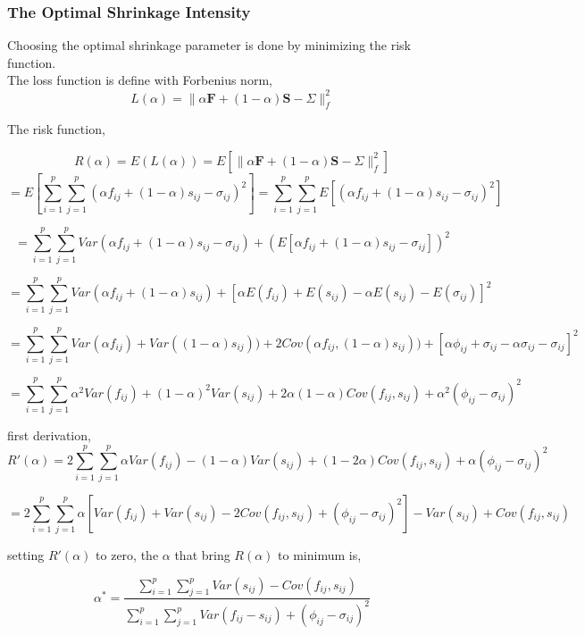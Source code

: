 \documentclass[letterpaper]{article}
\begin{document}
	\subsubsection{The Optimal Shrinkage Intensity}
	Choosing the optimal shrinkage parameter is done by minimizing the risk function.\\

	The loss function is define with Forbenius norm,
	\[L(\alpha) = 
	\lVert 
	\alpha\boldsymbol{F} + \left(1- \alpha  \right) \boldsymbol{S}
	-\Sigma 
	\lVert^{2}_{f} \]
	
	The risk function, 
	
	\[R(\alpha) = E(L(\alpha)) =
	E\left[
	\lVert 
	\alpha\boldsymbol{F} + \left(1- \alpha  \right) \boldsymbol{S}
	-\Sigma 
	\lVert^{2}_{f}   
	\right]
	\]
	\[
	= 
	E\left[   
	\sum_{i=1}^{p}\sum_{j=1}^{p}
	\left(
	\alpha f_{ij}  + (1-\alpha)s_{ij} -\sigma_{ij} 
	\right)^{2}
	\right]
	=
	\sum_{i=1}^{p}\sum_{j=1}^{p}E[	\left(
	\alpha f_{ij}  + (1-\alpha)s_{ij} -\sigma_{ij} 
	\right)^{2}]
	\]
	
	\[
	=
	\sum_{i=1}^{p}\sum_{j=1}^{p}
	Var(\alpha f_{ij} + (1-\alpha)s_{ij} - \sigma_{ij}) + \left(E\left[\alpha f_{ij} + (1-\alpha)s_{ij} - \sigma_{ij} \right] \right)^{2}
	\]
	
	 
	\[=
	\sum_{i=1}^{p}\sum_{j=1}^{p}
	Var(\alpha f_{ij} + (1-\alpha)s_{ij}) 
	+\left[\alpha E(f_{ij}) + E(s_{ij}) -\alpha E(s_{ij}) - E(\sigma_{ij})
	\right]^{2} 
	\]
	
	\[=
	\sum_{i=1}^{p}\sum_{j=1}^{p}
	Var(\alpha f_{ij}) + Var((1-\alpha)s_{ij})) +2Cov(\alpha f_{ij}, (1-\alpha)s_{ij})) 
	+\left[\alpha \phi_{ij} + \sigma_{ij} -\alpha \sigma_{ij} - \sigma_{ij}
	\right]^{2} 
	\]
	
	\[=
	\sum_{i=1}^{p}\sum_{j=1}^{p}
	\alpha^{2}Var(f_{ij})+(1-\alpha)^{2}Var(s_{ij})+2\alpha(1-\alpha)Cov(f_{ij},s_{ij}) +\alpha^{2}(\phi_{ij}-\sigma_{ij})^{2} 
	\]
	
	first derivation,
	\[
	R'(\alpha) = 2
	\sum_{i=1}^{p}\sum_{j=1}^{p}
	\alpha Var(f_{ij}) - (1-\alpha)Var(s_{ij}) +(1-2\alpha)Cov(f_{ij},s_{ij}) +\alpha(\phi_{ij}-\sigma_{ij})^{2}
	\]
	
	\[=
	2\sum_{i=1}^{p}\sum_{j=1}^{p}
	\alpha \left[ Var(f_{ij}) + Var(s_{ij}) -2Cov(f_{ij},s_{ij}) + (\phi_{ij}-\sigma_{ij})^{2}\right]
	- Var(s_{ij}) + Cov(f_{ij},s_{ij})
	\]
	
	setting \(R'(\alpha) \) to zero, the \(\alpha \) that bring \(R(\alpha) \) to minimum is,
	
	\[
	\alpha^* = 
	\frac{\sum_{i=1}^{p}\sum_{j=1}^{p}Var(s_{ij})-Cov(f_{ij},s_{ij})}
	{\sum_{i=1}^{p}\sum_{j=1}^{p}Var(f_{ij}-s_{ij}) + (\phi_{ij}-\sigma_{ij})^{2}}
	\]
	
\end{document}
